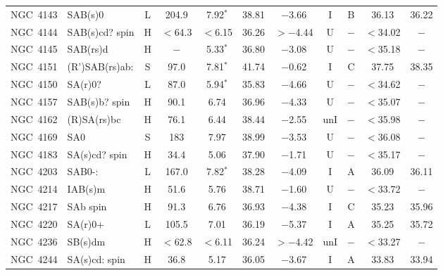 \begin{center}
\begin{longtable}{lC{2.5cm}ccccccccc}
NGC~4143  & SAB(s)0        & L                & 204.9 & 7.92$^{*}$       & 38.81    & $-$3.66     & I   & B      & 36.13   & 36.22   \\
NGC~4144   & SAB(s)cd? spin & H                & $<$64.3  & $<$6.15       & 36.26    & $>-$4.44     & U   &$-$      & $<$34.02 & $-$      \\
NGC~4145   & SAB(rs)d    & H          & $-$   & 5.33$^{*}$        & 36.80    & $-$3.08      & U   &$-$        & $<$35.18 & $-$      \\
NGC~4151   & (R')SAB(rs)ab:  & S                & 97.0    & 7.81$^{*}$       & 41.74    &  $-$0.62     & I   & C        & 37.75    & 38.35   \\
NGC~4150 & SA(r)0?         & L                & 87.0    & 5.94$^{*}$       & 35.83  & $-$4.66       & U   &$-$      & $<$34.62 & $-$      \\
NGC~4157 & SAB(s)b? spin   &  H               & 90.1  & 6.74             & 36.96    & $-$4.33        & U   &$-$        & $<$35.07 & $-$      \\
NGC~4162 & (R)SA(rs)bc     & H                & 76.1  & 6.44             & 38.44    & $-$2.55      & unI &$-$        & $<$35.98 & $-$      \\
NGC~4169 & SA0             & S                & 183   & 7.97              & 38.99    & $-$3.53    & U   &$-$        & $<$36.08 & $-$      \\
NGC~4183 & SA(s)cd? spin     & H                & 34.4  & 5.06              & 37.90    & $-$1.71   & U   &$-$        & $<$35.17 & $-$      \\
NGC~4203 & SAB0-:          &  L               & 167.0   & 7.82$^{*}$        & 38.28   & $-$4.09  & I   & A        & 36.09    & 36.11  \\
NGC~4214 & IAB(s)m         & H                & 51.6  & 5.76             & 38.71    & $-$1.60   & U   &$-$        & $<$33.72 & $-$      \\
NGC~4217 & SAb spin        & H                & 91.3  & 6.76             & 36.93    & $-$4.38     & I   & C        & 35.23    & 35.96    \\
NGC~4220 & SA(r)0+          & L                & 105.5 & 7.01              & 36.19    & $-$5.37  & I   & A        & 35.25    & 35.72    \\
NGC~4236 & SB(s)dm          & H                & $<$62.8  &  $<$6.11           & 36.24    & $>-$4.42     & unI &$-$   & $<$33.27  & $-$         \\
NGC~4244 & SA(s)cd: spin     & H                & 36.8  & 5.17             & 36.05    & $-$3.67   & I   & A        & 33.83 & 33.94        \\

\end{longtable}
\end{center}
